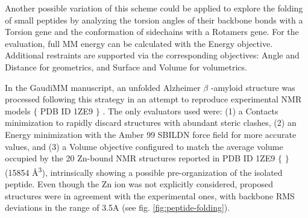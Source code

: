 Another possible variation of this scheme could be applied to explore the folding of small peptides by analyzing the torsion angles of their backbone bonds with a Torsion gene and the conformation of sidechains with a Rotamers gene. For the evaluation, full MM energy can be calculated with the Energy objective. Additional restraints are supported via the corresponding objectives: Angle and Distance for geometrics, and Surface and Volume for volumetrics.

In the GaudiMM manuscript, an unfolded Alzheimer $ \beta $ -amyloid structure was processed following this strategy in an attempt to reproduce experimental NMR models $ \{ $  PDB ID 1ZE9 $ \} $ . The only evaluators used were: (1) a Contacts minimization to rapidly discard structures with abundant steric clashes, (2) an Energy minimization with the Amber 99 SBILDN force field for more accurate values, and (3) a Volume objective configured to match the average volume occupied by the 20 Zn-bound NMR structures reported in PDB ID 1ZE9 $ \{ $ $ \} $  (15854 Å\textsuperscript{3}), intrinsically showing a possible pre-organization of the isolated peptide. Even though the Zn ion was not explicitly considered, proposed structures were in agreement with the experimental ones, with backbone RMS deviations in the range of 3.5A (see fig. \ref{fig:peptide-folding}).





